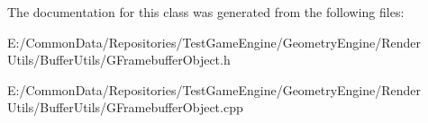 The documentation for this class was generated from the following files\+:\begin{DoxyCompactItemize}
\item 
E\+:/\+Common\+Data/\+Repositories/\+Test\+Game\+Engine/\+Geometry\+Engine/\+Render Utils/\+Buffer\+Utils/G\+Framebuffer\+Object.\+h\item 
E\+:/\+Common\+Data/\+Repositories/\+Test\+Game\+Engine/\+Geometry\+Engine/\+Render Utils/\+Buffer\+Utils/G\+Framebuffer\+Object.\+cpp\end{DoxyCompactItemize}
